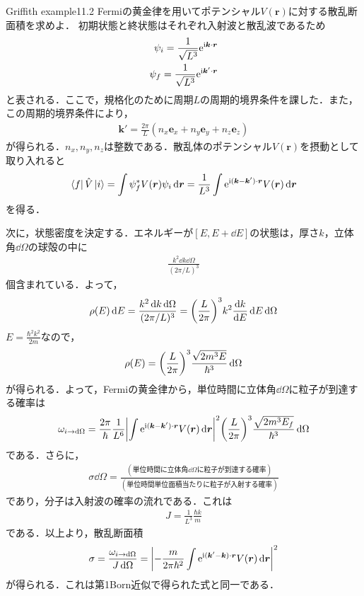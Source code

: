 \documentclass{report}
\begin{document}
  \begin{myexc}{Griffith example11.2}{}
    Fermiの黄金律を用いてポテンシャル$V(\bm{r})$に対する散乱断面積を求めよ．
    \tcblower
    初期状態と終状態はそれぞれ入射波と散乱波であるため
    \begin{align}
      \psi_i = \frac{1}{\sqrt{L^3}} \mathrm{e}^{\mathrm{i} \bm{k}\cdot\bm{r}}\\
      \psi_f = \frac{1}{\sqrt{L^3}} \mathrm{e}^{\mathrm{i} \bm{k}'\cdot\bm{r}}
    \end{align}
    と表される．ここで，規格化のために周期$L$の周期的境界条件を課した．また，この周期的境界条件により，
    \begin{align}
      \bm{k}' = \frac{2\pi}{L}(n_x \bm{e}_x + n_y \bm{e}_y + n_z \bm{e}_z)
    \end{align}
    が得られる．$n_x,n_y,n_z$は整数である．散乱体のポテンシャル$V(\bm{r})$を摂動として取り入れると
    \begin{align}
      \bra{f}\hat{V}\ket{i} = \int \psi_f^{*}V(\bm{r})\psi_i \dd{\bm{r}} = \frac{1}{L^3} \int \mathrm{e}^{\mathrm{i}(\bm{k} - \bm{k}')\cdot \bm{r}} V(\bm{r}) \dd{\bm{r}}
    \end{align}
    を得る．

    次に，状態密度を決定する．エネルギーが$[E,E+\dd{E}]$の状態は，厚さ$k$，立体角$\dd{\Omega}$の球殻の中に
    \begin{align}
      \frac{k^2 \dd{k} \dd{\Omega}}{(2\pi/L)^3}
    \end{align}
    個含まれている．よって，
    \begin{align}
      \rho(E) \dd{E} = \frac{k^2 \dd{k} \dd{\Omega}}{(2\pi/L)^3} = \qty(\frac{L}{2\pi})^3 k^2 \dv{k}{E} \dd{E} \dd{\Omega}
    \end{align}
    $E= \frac{\hbar^2 k^2}{2m}$なので，
    \begin{align}
      \rho(E) = \qty(\frac{L}{2\pi})^3 \frac{\sqrt{2m^3E}}{\hbar^3} \dd{\Omega}
    \end{align}
    が得られる．よって，Fermiの黄金律から，単位時間に立体角$\dd{\Omega}$に粒子が到達する確率は
    \begin{align}
      \omega_{i\to\dd{\Omega}} = \frac{2\pi}{\hbar} \frac{1}{L^6} \abs{\int \mathrm{e}^{\mathrm{i}(\bm{k} - \bm{k}')\cdot \bm{r}} V(\bm{r}) \dd{\bm{r}}}^2 \qty(\frac{L}{2\pi})^3 \frac{\sqrt{2m^3E_f}}{\hbar^3} \dd{\Omega}
    \end{align}
    である．さらに，
    \begin{align}
      \sigma \dd{\Omega} = \frac{(\text{単位時間に立体角$\dd{\Omega}$に粒子が到達する確率})}{(単位時間単位面積当たりに粒子が入射する確率)}
    \end{align}
    であり，分子は入射波の確率の流れである．これは
    \begin{align}
      J = \frac{1}{L^3}\frac{\hbar k}{m}
    \end{align}
    である．以上より，散乱断面積
    \begin{align}
      \sigma = \frac{\omega_{i\to\dd{\Omega}}}{J \dd{\Omega}} = \abs{-\frac{m}{2\pi\hbar^2}\int \mathrm{e}^{\mathrm{i}(\bm{k}' - \bm{k})\cdot\bm{r}}V(\bm{r})\dd{\bm{r}}}^2
    \end{align}
    が得られる．これは第1Born近似で得られた式と同一である．
  \end{myexc}
\end{document}
